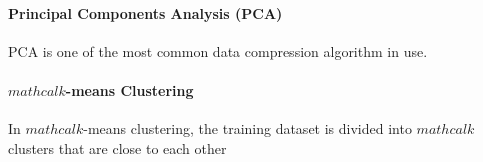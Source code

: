 \paragraph{Principal Components Analysis (PCA)}
PCA is one of the most common data compression algorithm in use. 

\paragraph{$mathcal{k}$-means Clustering}
In $mathcal{k}$-means clustering, the training dataset is divided into $mathcal{k}$ clusters that are close to each other